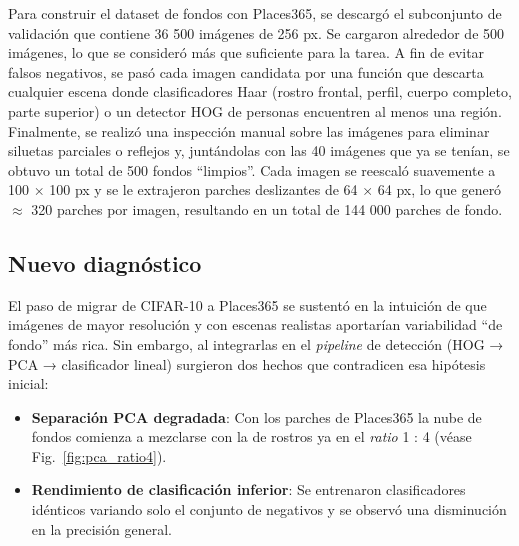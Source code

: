 \documentclass{article}
\begin{document}

Para construir el dataset de fondos con Places365, se descargó el subconjunto de validación que contiene 36 500 imágenes de 256 px. Se cargaron alrededor de 500 imágenes, lo que se consideró más que suficiente para la tarea. A fin de evitar falsos negativos, se pasó cada imagen candidata por una función que descarta cualquier escena donde clasificadores Haar (rostro frontal, perfil, cuerpo completo, parte superior) o un detector HOG de personas encuentren al menos una región. Finalmente, se realizó una inspección manual sobre las imágenes para eliminar siluetas parciales o reflejos y, juntándolas con las 40 imágenes que ya se tenían, se obtuvo un total de 500 fondos “limpios”. Cada imagen se reescaló suavemente a 100 × 100 px y se le extrajeron parches deslizantes de 64 × 64 px, lo que generó $\approx$ 320 parches por imagen, resultando en un total de 144 000 parches de fondo.

\subsection*{Nuevo diagnóstico}

El paso de migrar de CIFAR-10 a Places365 se sustentó en la intuición de que imágenes de mayor resolución y con escenas realistas aportarían variabilidad “de fondo” más rica. Sin embargo, al integrarlas en el \textit{pipeline} de detección (HOG → PCA → clasificador lineal) surgieron dos hechos que contradicen esa hipótesis inicial:
\begin{itemize}
    \item \textbf{Separación PCA degradada}: Con los parches de Places365 la nube de fondos comienza a mezclarse con la de rostros ya en el \textit{ratio} 1 : 4 (véase Fig.~\ref{fig:pca_ratio4}).
    \item \textbf{Rendimiento de clasificación inferior}: Se entrenaron clasificadores idénticos variando solo el conjunto de negativos y se observó una disminución en la precisión general.
\end{itemize}
\end{document}
